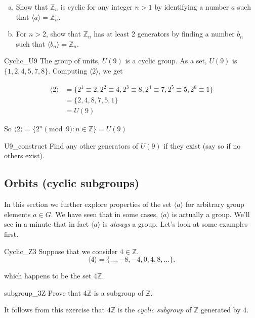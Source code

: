 \begin{exercise}{}
\begin{enumerate}[(a)]
\item
Show that  ${\mathbb Z}_n$ is cyclic for any integer $n > 1$ by identifying a number $a$ such that $\langle a \rangle = {\mathbb Z}_n$.
\item
For $n>2$, show that ${\mathbb Z}_n$ has at least 2 generators by finding a number $b_n$ such that 
$\langle b_n \rangle = {\mathbb Z}_n$.
\end{enumerate}
\end{exercise}

\begin{example}{Cyclic_U9}
The group of units, $U(9)$ is a cyclic group.  As a
set, $U(9)$ is $\{ 1, 2, 4, 5, 7, 8  \}$. Computing $\langle 2 \rangle$, we get 

\begin{align*}
 \langle 2 \rangle &= \{ 2^1 \equiv 2, 2^2 \equiv 4, 2^3 \equiv 8, 2^4 \equiv 7, 2^5 \equiv 5, 2^6 \equiv 1 \} \\
 &= \{2, 4, 8, 7, 5, 1\} \\
 &= U(9)
 \end{align*}

\noindent
So $\langle 2 \rangle = \{ 2^n \pmod{9} : n \in \mathbb Z \} = U(9)$
\end{example}

\begin{exercise}{U9_construct}
Find any other generators of $U(9)$ if they exist (say so if no others exist).
\end{exercise}

\subsection{Orbits (cyclic subgroups)}
\label{subsec:Groups:GroupProperties:CyclicSubgroups}

In this section we further explore properties of the set $\langle a \rangle$ for arbitrary group elements $a \in G$. We have seen that in some cases, $\langle a \rangle$ is actually  a group. We'll see in a minute that in fact $\langle a \rangle$ is \emph{always} a group. Let's look at some examples first.

\begin{example}{Cyclic_Z3}
Suppose that we consider $4 \in {\mathbb Z}$. 
\[
\langle 4 \rangle = \{ \ldots,-8, -4, 0, 4, 8, \ldots \}.
\]

\noindent
which happens to be the set $4 {\mathbb Z}$.

\begin{exercise}{subgroup_3Z}
Prove that $4 {\mathbb Z}$ is a subgroup of $\mathbb Z$.
\end{exercise}
It follows from this exercise that $4 {\mathbb Z}$ is the \emph{cyclic subgroup} of $\mathbb Z$ generated by $4$.
\end{example}


